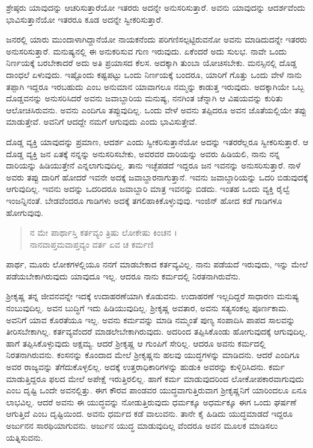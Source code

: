 {\small ಶ್ರೇಷ್ಠರು ಯಾವುದನ್ನು ಆಚರಿಸುತ್ತಾರೆಯೋ ಇತರರು ಅದನ್ನೇ ಅನುಸರಿಸುತ್ತಾರೆ. ಅವನು ಯಾವುದನ್ನು ಆದರ್ಶವೆಂದು ಭಾವಿಸುತ್ತಾನೆಯೋ ಇತರರೂ ಕೂಡ ಅದನ್ನೇ ಸ್ವೀಕರಿಸುತ್ತಾರೆ.}

ಜನರಲ್ಲಿ ಯಾರು ಮುಂದಾಳಾಗಿದ್ದಾನೆಯೋ ನಾಯಕನೆಂದು ಪರಿಗಣಿಸಲ್ಪಟ್ಟಿರುವನೋ ಅವನು ಮಾಡಿದುದನ್ನೇ ಇತರರು ಅನುಸರಿಸುತ್ತಾರೆ. ಮನುಷ್ಯನಲ್ಲಿ ಈ ಅನುಕರಿಸುವ ಗುಣ ಇರುವುದು. ಏಕೆಂದರೆ ಅದು ಸುಲಭ. ನಾವೇ ಒಂದು ನಿರ್ಣಯಕ್ಕೆ ಬರಬೇಕಾದರೆ ಅದು ಅತಿ ಪ್ರಯಾಸದ ಕೆಲಸ. ಅದಕ್ಕಾಗಿ ತುಂಬಾ ಯೋಚಿಸಬೇಕು. ಮನಸ್ಸಿನಲ್ಲಿ ದೊಡ್ಡ ದಾಂಧಲೆ ಏಳುವುದು. ಇಷ್ಟೊಂದು ಕಷ್ಟಪಟ್ಟು ಒಂದು ನಿರ್ಣಯಕ್ಕೆ ಬಂದರೂ, ಯಾರಿಗೆ ಗೊತ್ತು ಒಂದು ವೇಳೆ ನಾನು ತಪ್ಪಾಗಿ ಇದ್ದರೂ ಇರಬಹುದು ಎಂಬ ಅನುಮಾನ ಯಾವಾಗಲೂ ನಮ್ಮನ್ನು ಕಾಡುತ್ತ ಇರುವುದು. ಅದಕ್ಕಾಗಿಯೇ ಒಬ್ಬ ದೊಡ್ಡವನನ್ನು ಅನುಸರಿಸಿದರೆ ಅವನು ಜವಾಬ್ದಾರಿಯ ಮನುಷ್ಯ, ನನಗಿಂತ ಚೆನ್ನಾಗಿ ಆ ವಿಷಯವನ್ನು ಕುರಿತು ಆಲೋಚಿಸಿರುವನು. ಅವನು ಎಂದಿಗೂ ತಪ್ಪುವುದಿಲ್ಲ. ಒಂದು ವೇಳೆ ಅವನು ತಪ್ಪಿದರೂ ಅವನ ಜೊತೆಯಲ್ಲಿಯೇ ತಪ್ಪು ಮಾಡುತ್ತೇವೆ. ಅವನಿಗೆ ಆದದ್ದೇ ನಮಗೆ ಆಗುವುದು ಎಂದು ಭಾವಿಸುತ್ತೇವೆ.

ದೊಡ್ಡ ವ್ಯಕ್ತಿ ಯಾವುದನ್ನು ಪ್ರಮಾಣ, ಆದರ್ಶ ಎಂದು ಸ್ವೀಕರಿಸುತ್ತಾನೆಯೋ ಅದನ್ನು ಇತರರೆಲ್ಲರೂ ಸ್ವೀಕರಿಸುತ್ತಾರೆ. ಆ ದೊಡ್ಡ ವ್ಯಕ್ತಿ ಜನ ಏತಕ್ಕೆ ನನ್ನನ್ನು ಅನುಸರಿಸಬೇಕು, ಅವರವರ ದಾರಿಯನ್ನು ಅವರು ಹಿಡಿಯಲಿ, ನಾನು ನನ್ನ ದಾರಿಯನ್ನು ಹಿಡಿಯುತ್ತೇನೆ ಎನ್ನಲಾಗುವುದಿಲ್ಲ. ತಾನು ಇಚ್ಛೆಪಡದೆ ಇದ್ದರೂ ಜನ ಇವನನ್ನು ಅನುಸರಿಸುತ್ತಾರೆ. ನಾಳೆ ಅವರು ತಪ್ಪು ದಾರಿಗೆ ಹೋದರೆ ಇವನೇ ಅದಕ್ಕೆ ಜವಾಬ್ದಾರನಾಗುತ್ತಾನೆ. ಇವನು ಜವಾಬ್ದಾರಿಯನ್ನು ಒದರಿ ಬಿಡುವುದಕ್ಕೆ ಆಗುವುದಿಲ್ಲ. ಇವನು ಅದನ್ನು ಒದರಿದರೂ ಜವಾಬ್ದಾರಿ ಮಾತ್ರ ಇವನನ್ನು ಬಿಡದು. ಇಂತಹ ಒಂದು ವ್ಯಕ್ತಿ ರೈಲ್ವೆ ಇಂಜನ್ನಿನಂತೆ. ಬೇಡವೆಂದರೂ ಗಾಡಿಗಳು ಅದಕ್ಕೆ ತಗಲಿಹಾಕಿಕೊಳ್ಳುವುವು. ಇಂಜಿನ್ ಹೋದ ಕಡೆ ಗಾಡಿಗಳೂ ಹೋಗುವುವು.

\begin{verse}
ನ ಮೇ ಪಾರ್ಥಾಸ್ತಿ ಕರ್ತವ್ಯಂ ತ್ರಿಷು ಲೋಕೇಷು ಕಿಂಚನ ।\\ನಾನವಾಪ್ತಮವಾಪ್ತವ್ಯಂ ವರ್ತ ಏವ ಚ ಕರ್ಮಣಿ 
\end{verse}

{\small ಪಾರ್ಥ, ಮೂರು ಲೋಕಗಳಲ್ಲಿಯೂ ನನಗೆ ಮಾಡಬೇಕಾದ ಕರ್ತವ್ಯವಿಲ್ಲ. ನಾನು ಪಡೆಯದೆ ಇರುವುದು, ಇನ್ನು ಮೇಲೆ ಪಡೆಯಬೇಕಾಗಿರುವುದು ಯಾವುದೂ ಇಲ್ಲ. ಆದರೂ ನಾನು ಕರ್ಮದಲ್ಲಿ ನಿರತನಾಗಿರುವೆನು.}

ಶ್ರೀಕೃಷ್ಣ ತನ್ನ ಜೀವನವನ್ನೇ ಇದಕ್ಕೆ ಉದಾಹರಣೆಯಾಗಿ ಕೊಡುವನು. ಉದಾಹರಣೆ ಇಲ್ಲದಿದ್ದರೆ ಸಾಧಾರಣ ಮನುಷ್ಯ ನಂಬುವುದಿಲ್ಲ. ಅವನ ಬುದ್ಧಿಗೆ ಇದು ಹಿಡಿಯುವುದಿಲ್ಲ. ಶ್ರೀಕೃಷ್ಣ ಅವತಾರ, ಅವನು ಸತ್ಯಸಂಕಲ್ಪ ಪೂರ್ಣಕಾಮ. ಅವನಿಗೆ ಯಾವ ಕೊರತೆಯೂ ಇಲ್ಲ. ಅವನು ಕರ್ಮವನ್ನು ಮಾಡಿ ನಮ್ಮಂತೆ ಪುಣ್ಯ ಸಂಪಾದಿಸಿ ಪಾಪದ ಸಾಲವನ್ನು ತೀರಿಸಬೇಕಾಗಿಲ್ಲ. ಕರ್ತವ್ಯವೆಂದರೆ ಮಾಡಲೇಬೇಕಾಗಿರುವುದು. ಅದರಿಂದ ತಪ್ಪಿಸಿಕೊಂಡು ಹೋಗುವುದಕ್ಕೆ ಆಗುವುದಿಲ್ಲ. ಹಾಗೆ ತಪ್ಪಿಸಿಕೊಳ್ಳುವುದು ಅಕ್ಷಮ್ಯ. ಆದರೆ ಶ್ರೀಕೃಷ್ಣ ಆ ಗುಂಪಿಗೆ ಸೇರಿಲ್ಲ. ಆದರೂ ಅವನು ಕರ್ಮದಲ್ಲಿ ನಿರತನಾಗಿರುವನು. ಕಂಸನನ್ನು ಕೊಂದಾದ ಮೇಲೆ ಶ್ರೀಕೃಷ್ಣನು ಹಲವು ಯುದ್ಧಗಳನ್ನು ಮಾಡಿದನು. ಆದರೆ ಎಂದಿಗೂ ಅವರ ರಾಜ್ಯವನ್ನು ತೆಗೆದುಕೊಳ್ಳಲಿಲ್ಲ. ಅದಕ್ಕೆ ಉತ್ತರಾಧಿಕಾರಿಗಳನ್ನು ಹುಡುಕಿ ಅವರನ್ನು ಕುಳ್ಳಿರಿಸಿದನು. ಕರ್ಮ ಮಾಡುತ್ತಿದ್ದರೂ ಫಲದ ಮೇಲೆ ಅಪೇಕ್ಷೆ ಇರುತ್ತಿರಲಿಲ್ಲ. ಹಾಗೆ ಕರ್ಮ ಮಾಡುವುದರಿಂದ ಲೋಕೋಪಕಾರವಾಗುವುದು ಎಂಬ ದೃಷ್ಟಿ ಒಂದೇ ಅವನಲ್ಲಿತ್ತು. ಈಗ ಕೌರವ ಪಾಂಡವರ ಯುದ್ಧವಾಗುತ್ತಿರುವಾಗ ಶ್ರೀಕೃಷ್ಣನಿಗೆ ಯಾರಿಂದಲೂ ಏನೂ ಲಾಭವಿಲ್ಲ. ಆದರೆ ಅವನು ಈ ಯುದ್ಧವನ್ನು ನೋಡುತ್ತಿರುವುದು ಧರ್ಮಕ್ಕೂ ಅಧರ್ಮಕ್ಕೂ ಈಗ ಒಂದು ಘರ್ಷಣೆ ಆಗುತ್ತಿದೆ ಎಂಬ ದೃಷ್ಟಿಯಿಂದ. ಅವನು ಧರ್ಮದ ಕಡೆ ವಾಲುವನು. ತಾನೇ ಕೈ ಹಿಡಿದು ಯುದ್ಧಮಾಡದೆ ಇದ್ದರೂ ಅರ್ಜುನನ ಸಾರಥಿಯಾಗುವನು. ಅರ್ಜುನ ಯುದ್ಧ ಮಾಡುವುದಿಲ್ಲ ವೆಂದರೂ ಅವನ ಮೂಲಕ ಮಾಡಿಸಲು ಯತ್ನಿಸುವನು.

